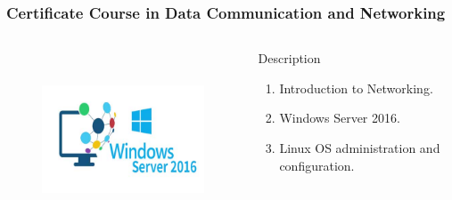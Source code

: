 \begin{frame}
	\frametitle{{\large Certificate Course in Data Communication and Networking}}
		\begin{columns}
		
		
		\begin{figure}
			\includegraphics[width=180pt,height=150pt]{figures/course_dcn.jpg}
		\end{figure}
		
		
		\begin{block}{Description}
			
			\begin{enumerate}
				\item Introduction to Networking. 
				\item Windows Server 2016.
				\item Linux OS administration and configuration.
			\end{enumerate}
			
		\end{block}
		
	\end{columns}
\end{frame}
